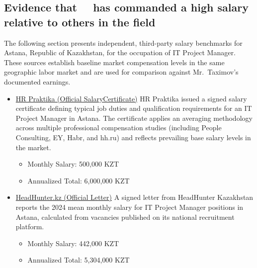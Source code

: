 \subsection{Evidence that ~\mrl\ has commanded a high salary relative to others in the field}

\label{subsec:Salary}

The following section presents independent, third-party salary benchmarks for Astana, Republic of Kazakhstan, for the occupation of IT Project Manager. These sources establish baseline market compensation levels in the same geographic labor market and are used for comparison against Mr.~Taximov’s documented earnings.

\medskip

\begin{itemize}
\item \underline{HR Praktika (Official SalaryCertificate)}
HR Praktika issued a signed salary certificate defining typical job duties and qualification requirements for an IT Project Manager in Astana. The certificate applies an averaging methodology across multiple professional compensation studies (including People Consulting, EY, Habr, and hh.ru) and reflects prevailing base salary levels in the market.

\vspace{-0.5\baselineskip}
\begin{itemize}[nosep]
    \item Monthly Salary: 500{,}000 KZT
    \item Annualized Total: 6{,}000{,}000 KZT 
\end{itemize}



\medskip

\item \underline{HeadHunter.kz (Official Letter)}
A signed letter from HeadHunter Kazakhstan reports the 2024 mean monthly salary for IT Project Manager positions in Astana, calculated from vacancies published on its national recruitment platform.

\vspace{-0.5\baselineskip}
\begin{itemize}[nosep]
    \item Monthly Salary: 442{,}000 KZT
    \item Annualized Total: 5{,}304{,}000 KZT 
\end{itemize}




\end{itemize}
